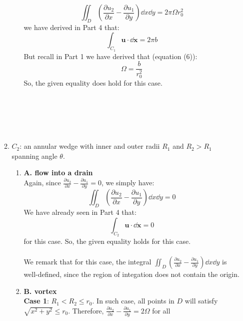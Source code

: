 \documentclass{article}
\begin{document}
\begin{enumerate}
\begin{enumerate}
\begin{enumerate}
    \begin{equation*}
      \iint_D \left(\frac{\partial u_2}{\partial x} - \frac{\partial u_1}{\partial y}\right) \dd x\dd y = 2 \pi \Omega r_0^2
    \end{equation*}
    we have derived in Part 4 that:
    \begin{equation*}
        \int_{C_1} \mathbf{u}\cdot \dd \mathbf{x} = 2\pi b
    \end{equation*}
    But recall in Part 1 we have derived that (equation (6)):
    \begin{equation}
      \Omega = \frac{b}{r_0^2}
    \end{equation}
    So, the given equality does hold for this case. \\
    \end{enumerate}\text{ }\\
    \\
  \pagebreak \\ \\
  \item \(C_2\): an annular wedge with inner and outer radii \(R_1\) and \(R_2>R_1\) spanning angle \(\theta\).
  \begin{enumerate}
    \item \textbf{A. flow into a drain}\\
    Again, since \(\frac{\partial u_2}{\partial x} - \frac{\partial u_1}{\partial y}=0\), we simply have:
    \begin{equation}
      \iint_D \left(\frac{\partial u_2}{\partial x} - \frac{\partial u_1}{\partial y}\right) \dd x\dd y =0
    \end{equation}
    We have already seen in Part 4 that:
    \begin{equation}
      \int_{C_2} \mathbf{u}\cdot \dd \mathbf{x} = 0
    \end{equation}
    for this case. So, the given equality holds for this case.\\
    \\
    We remark that for this case, the integral \(  \iint_D \left(\frac{\partial u_2}{\partial x} - \frac{\partial u_1}{\partial y}\right) \dd x\dd y\) is well-defined, since the region of integation does not contain the origin. \\
    \item \textbf{B. vortex}\\
    \textbf{Case 1}: \(R_1 <R_2 \le r_0\).
     In such case, all points in \(D\) will satisfy \(\sqrt{x^2+y^2}\le r_0\).
    Therefore, \(\frac{\partial u_2}{\partial x} - \frac{\partial u_1}{\partial y} = 2\Omega\) for all

\end{enumerate}
\end{enumerate}
\end{enumerate}
\end{document}
